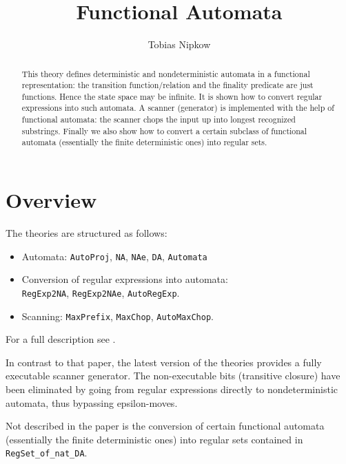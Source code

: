 \documentclass[11pt,a4paper]{article}
\begin{document}
\title{Functional Automata}
\author{Tobias Nipkow}
\maketitle

\begin{abstract}
This theory defines deterministic and nondeterministic automata in a
functional representation: the transition function/relation and the finality
predicate are just functions. Hence the state space may be infinite.  It is
shown how to convert regular expressions into such automata. A scanner
(generator) is implemented with the help of functional automata: the scanner
chops the input up into longest recognized substrings. Finally we also show
how to convert a certain subclass of functional automata (essentially the
finite deterministic ones) into regular sets.
\end{abstract}

\section{Overview}

The theories are structured as follows:
\begin{itemize}
\item Automata:
 \texttt{AutoProj}, \texttt{NA}, \texttt{NAe}, \texttt{DA}, \texttt{Automata}
\item Conversion of regular expressions into automata:\\
  \texttt{RegExp2NA}, \texttt{RegExp2NAe}, \texttt{AutoRegExp}.
\item Scanning: \texttt{MaxPrefix}, \texttt{MaxChop}, \texttt{AutoMaxChop}.
\end{itemize}
For a full description see \cite{Nipkow-TPHOLs98}.

In contrast to that paper, the latest version of the theories provides a
fully executable scanner generator. The non-executable bits (transitive
closure) have been eliminated by going from regular expressions directly to
nondeterministic automata, thus bypassing epsilon-moves.

Not described in the paper is the conversion of certain functional automata
(essentially the finite deterministic ones) into regular sets contained in
\texttt{RegSet\_of\_nat\_DA}.





\end{document}
